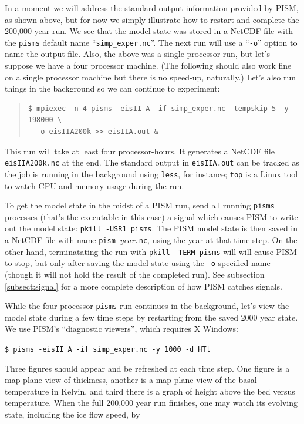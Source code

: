 \documentclass[11pt,final]{amsart}
\renewcommand{\t}[1]{\texttt{#1}}
\begin{document}
In a moment we will address the standard output information provided by PISM, as shown above, but for now we simply illustrate how to restart and complete the 200,000 year run.  We see that the model state was stored in a NetCDF file with the \verb|pisms| default name ``\verb|simp_exper.nc|''.  The next run will use a ``\verb|-o|'' option to name the output file.  Also, the above was a single processor run, but let's suppose we have a four processor machine.  (The following should also work fine on a single processor machine but there is no speed-up, naturally.)  Let's also run things in the background so we can continue to experiment:

\small\begin{quote}\begin{verbatim}
$ mpiexec -n 4 pisms -eisII A -if simp_exper.nc -tempskip 5 -y 198000 \
  -o eisIIA200k >> eisIIA.out &
\end{verbatim}
\end{quote}\normalsize

This run will take at least four processor-hours.  It generates a NetCDF file \verb|eisIIA200k.nc| at the end.  The standard output in \verb|eisIIA.out| can be tracked as the job is running in the background using \verb|less|, for instance; \t{top} is a Linux tool to watch CPU and memory usage during the run.

To get the model state in the midst of a PISM run, send all running \verb|pisms| processes (that's the executable in this case) a signal which causes PISM to write out the model state: \verb|pkill -USR1 pisms|.  The PISM model state is then saved in a NetCDF file with name \verb|pism-|\emph{year}\verb|.nc|, using the year at that time step.  On the other hand, terminatating the run with \verb|pkill -TERM pisms| will will cause PISM to stop, but only after saving the model state using the \verb|-o| specified name (though it will not hold the result of the completed run).  See subsection \ref{subsect:signal} for a more complete description of how PISM catches signals.

While the four processor \verb|pisms| run continues in the background, let's view the model state during a few time steps by restarting from the saved 2000 year state.  We use PISM's ``diagnostic viewers'', which requires X Windows:

\verb|$ pisms -eisII A -if simp_exper.nc -y 1000 -d HTt|

Three figures should appear and be refreshed at each time step.  One figure is a map-plane view of thickness, another is a map-plane view of the basal temperature in Kelvin, and third there is a graph of height above the bed versus temperature.  When the full 200,000 year run finishes, one may watch its evolving state, including the ice flow speed, by
\end{document}
